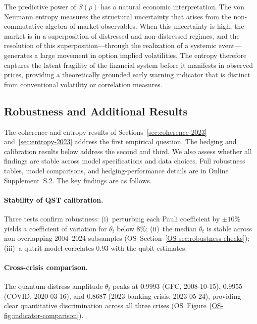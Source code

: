 \begin{remark}\label{rem:entropy-econ}
The predictive power of $S(\rho)$ has a natural economic interpretation. The von
Neumann entropy measures the structural uncertainty that arises from the
non-commutative algebra of market observables. When this uncertainty is high, the
market is in a superposition of distressed and non-distressed regimes, and the
resolution of this superposition---through the realization of a systemic
event---generates a large movement in option implied volatilities. The entropy
therefore captures the latent fragility of the financial system before it
manifests in observed prices, providing a theoretically grounded early warning
indicator that is distinct from conventional volatility or correlation measures.
\end{remark}

\subsection{Robustness and Additional Results}\label{sec:robustness}

The coherence and entropy results of Sections~\ref{sec:coherence-2023}
and~\ref{sec:entropy-2023} address the first empirical question. The hedging
and calibration results below address the second and third. We also assess
whether all findings are stable across model specifications and data choices.
Full robustness tables, model comparisons, and hedging-performance details are in
Online Supplement~S.2. The key findings are as follows.

\paragraph{Stability of QST calibration.}
Three tests confirm robustness: (i)~perturbing each Pauli coefficient by $\pm 10\%$
yields a coefficient of variation for $\theta_t$ below $8\%$; (ii)~the median
$\theta_t$ is stable across non-overlapping 2004--2024 subsamples
(OS~Section~\ref{OS-sec:robustness-checks});
(iii)~a qutrit model correlates $0.93$ with the qubit estimates.

\paragraph{Cross-crisis comparison.}
The quantum distress amplitude $\theta_t$ peaks at $0.9993$ (GFC, 2008-10-15),
$0.9955$ (COVID, 2020-03-16), and $0.8687$ (2023 banking crisis, 2023-05-24),
providing clear quantitative discrimination across all three crises
(OS~Figure~\ref{OS-fig:indicator-comparison}).

